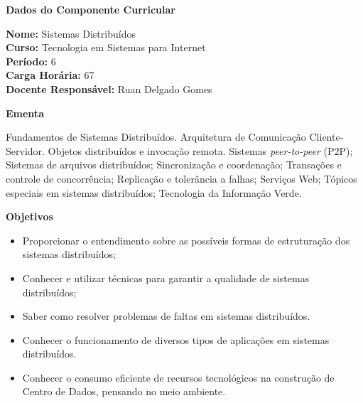 

\begin{snugshade}\begin{center}\textbf{
    Dados do Componente Curricular
}\end{center}\end{snugshade}

\noindent \textbf{Nome:}                Sistemas Distribu\'idos
\\        \textbf{Curso:}               Tecnologia em Sistemas para Internet
\\        \textbf{Período:}             \unit{6}{\degree}
\\        \textbf{Carga Horária:}       \unit{67}{\hour}
\\        \textbf{Docente Responsável:} Ruan Delgado Gomes


\begin{snugshade}\begin{center}\textbf{
    Ementa
\vphantom{q}}\end{center}\end{snugshade}

\noindent
Fundamentos de Sistemas Distribuídos. Arquitetura de Comunicação Cliente-Servidor. Objetos distribu\'idos e invoca\c{c}\~ao remota. Sistemas \textit{peer-to-peer} (P2P); Sistemas de arquivos distribuídos; Sincronização e coordena\c{c}\~ao; Transações e controle de concorr\^encia; Replicação e tolerância a falhas; Serviços Web; T\'opicos especiais em sistemas distribu\'idos; Tecnologia da Informação Verde.


\begin{snugshade}\begin{center}\textbf{
    Objetivos
}\end{center}\end{snugshade}

\begin{itemize}

\item Proporcionar o entendimento sobre as possíveis formas de estruturação dos sistemas distribuídos;

\item Conhecer e utilizar técnicas para garantir a qualidade de sistemas distribuídos;

\item Saber como resolver problemas de faltas em sistemas distribuídos.

\item Conhecer o funcionamento de diversos tipos de aplicações em sistemas distribuídos.

\item Conhecer o consumo eficiente de recursos tecnológicos na construção de Centro de Dados, pensando no meio ambiente.

\end{itemize} 

